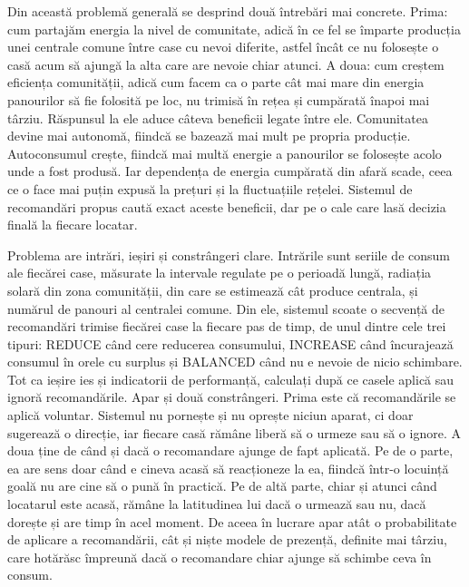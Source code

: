 \documentclass[12pt,a4paper]{report}
\begin{document}
Din această problemă generală se desprind două întrebări mai concrete. Prima: cum partajăm energia la nivel de comunitate, adică în ce fel se împarte producția unei centrale comune între case cu nevoi diferite, astfel încât ce nu folosește o casă acum să ajungă la alta care are nevoie chiar atunci. A doua: cum creștem eficiența comunității, adică cum facem ca o parte cât mai mare din energia panourilor să fie folosită pe loc, nu trimisă în rețea și cumpărată înapoi mai târziu. Răspunsul la ele aduce câteva beneficii legate între ele. Comunitatea devine mai autonomă, fiindcă se bazează mai mult pe propria producție. Autoconsumul crește, fiindcă mai multă energie a panourilor se folosește acolo unde a fost produsă. Iar dependența de energia cumpărată din afară scade, ceea ce o face mai puțin expusă la prețuri și la fluctuațiile rețelei. Sistemul de recomandări propus caută exact aceste beneficii, dar pe o cale care lasă decizia finală la fiecare locatar.

Problema are intrări, ieșiri și constrângeri clare. Intrările sunt seriile de consum ale fiecărei case, măsurate la intervale regulate pe o perioadă lungă, radiația solară din zona comunității, din care se estimează cât produce centrala, și numărul de panouri al centralei comune. Din ele, sistemul scoate o secvență de recomandări trimise fiecărei case la fiecare pas de timp, de unul dintre cele trei tipuri: REDUCE când cere reducerea consumului, INCREASE când încurajează consumul în orele cu surplus și BALANCED când nu e nevoie de nicio schimbare. Tot ca ieșire ies și indicatorii de performanță, calculați după ce casele aplică sau ignoră recomandările. Apar și două constrângeri. Prima este că recomandările se aplică voluntar. Sistemul nu pornește și nu oprește niciun aparat, ci doar sugerează o direcție, iar fiecare casă rămâne liberă să o urmeze sau să o ignore. A doua ține de când și dacă o recomandare ajunge de fapt aplicată. Pe de o parte, ea are sens doar când e cineva acasă să reacționeze la ea, fiindcă într-o locuință goală nu are cine să o pună în practică. Pe de altă parte, chiar și atunci când locatarul este acasă, rămâne la latitudinea lui dacă o urmează sau nu, dacă dorește și are timp în acel moment. De aceea în lucrare apar atât o probabilitate de aplicare a recomandării, cât și niște modele de prezență, definite mai târziu, care hotărăsc împreună dacă o recomandare chiar ajunge să schimbe ceva în consum.
\end{document}
